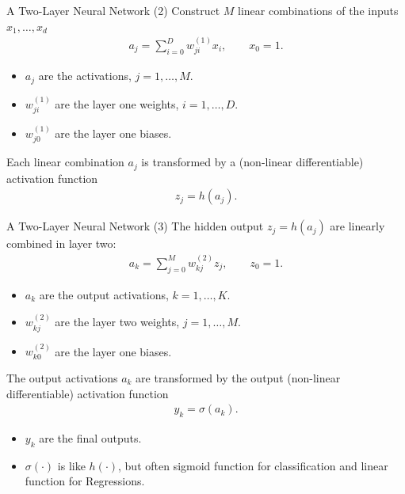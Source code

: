 \documentclass[10pt, hyperref={colorlinks = true,linkcolor = blue}]{beamer}
\begin{document}
{{\begin{frame}{A Two-Layer Neural Network (2)}
Construct $M$ linear combinations of the inputs $x_1,\ldots,x_d$
\begin{align*}
a_j = \sum_{i=0}^{D}w_{ji}^{(1)}x_i, \qquad x_0 =1.
\end{align*}
\begin{itemize}
\item $a_j$ are the activations, $j=1,\ldots,M$.
\item $w_{ji}^{(1)}$ are the layer one weights, $i=1,\ldots,D$.
\item $w_{j0}^{(1)}$ are the layer one biases.
\end{itemize}
Each linear combination $a_j$ is transformed by a (non-linear differentiable) activation function
\begin{align*}
z_j = h(a_j).
\end{align*} 
\end{frame}


\begin{frame}{A Two-Layer Neural Network (3)}
The hidden output $z_j = h(a_j)$ are linearly combined in layer two:
\begin{align*}
a_k = \sum_{j=0}^{M}w_{kj}^{(2)}z_j, \qquad z_0 =1.
\end{align*}
\begin{itemize}
\item $a_k$ are the output activations, $k=1,\ldots,K$.
\item $w_{kj}^{(2)}$ are the layer two weights, $j=1,\ldots,M$.
\item $w_{k0}^{(2)}$ are the layer one biases. 
\end{itemize}
The output activations $a_k$ are transformed by the output (non-linear differentiable) activation function
\begin{align*}
y_k = \sigma(a_k).
\end{align*} 
\begin{itemize}
\item $y_k$ are the final outputs.
\item $\sigma(\cdot)$ is like $h(\cdot)$, but often sigmoid function for classification and linear function for Regressions.
\end{itemize}
\end{frame}

}}
\end{document}
